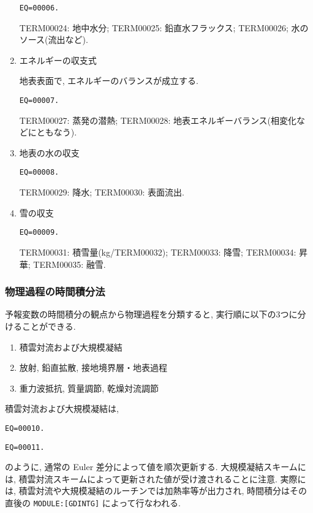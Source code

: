 \begin{enumerate}
\begin{verbatim}
EQ=00006.
\end{verbatim}

TERM00024: 地中水分; 
TERM00025: 鉛直水フラックス;
TERM00026; 水のソース(流出など).

\item エネルギーの収支式

地表表面で, エネルギーのバランスが成立する.

\begin{verbatim}
EQ=00007.
\end{verbatim}

TERM00027: 蒸発の潜熱;
TERM00028: 地表エネルギーバランス(相変化などにともなう).

\item 地表の水の収支

\begin{verbatim}
EQ=00008.
\end{verbatim}

TERM00029: 降水;
TERM00030: 表面流出.

\item 雪の収支

\begin{verbatim}
EQ=00009.
\end{verbatim}

TERM00031: 積雪量(kg/TERM00032);
TERM00033: 降雪;
TERM00034: 昇華;
TERM00035: 融雪.

\end{enumerate}

\subsubsection{物理過程の時間積分法}

予報変数の時間積分の観点から物理過程を分類すると,
実行順に以下の3つに分けることができる.
\begin{enumerate}
\item 積雲対流および大規模凝結
\item 放射, 鉛直拡散, 接地境界層・地表過程       
\item 重力波抵抗, 質量調節, 乾燥対流調節
\end{enumerate}

積雲対流および大規模凝結は,
\begin{verbatim}
EQ=00010.
\end{verbatim}
\begin{verbatim}
EQ=00011.
\end{verbatim}
のように, 通常の Euler 差分によって値を順次更新する.
大規模凝結スキームには, 
積雲対流スキームによって更新された値が受け渡されることに注意.
実際には, 積雲対流や大規模凝結のルーチンでは加熱率等が出力され,
時間積分はその直後の \texttt{MODULE:[GDINTG]} によって行なわれる.

